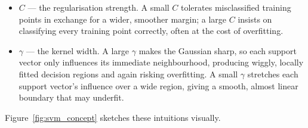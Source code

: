 \documentclass[11pt]{article}
\begin{document}
\begin{itemize}\setlength\itemsep{2pt}
  \item \textbf{$C$} --- the regularisation strength. A small $C$ tolerates
        misclassified training points in exchange for a wider, smoother
        margin; a large $C$ insists on classifying every training point
        correctly, often at the cost of overfitting.
  \item \textbf{$\gamma$} --- the kernel width. A large $\gamma$ makes the
        Gaussian sharp, so each support vector only influences its immediate
        neighbourhood, producing wiggly, locally fitted decision regions and
        again risking overfitting. A small $\gamma$ stretches each support
        vector's influence over a wide region, giving a smooth, almost linear
        boundary that may underfit.
\end{itemize}

Figure~\ref{fig:svm_concept} sketches these intuitions visually.
\end{document}
